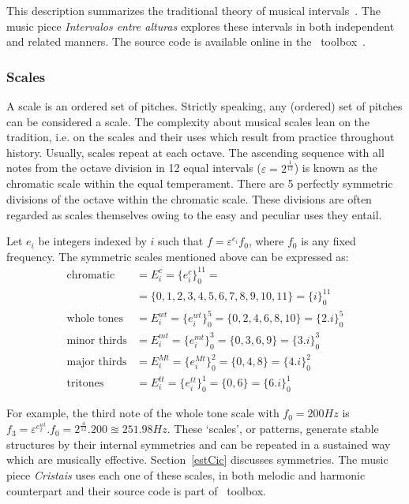 This description summarizes the traditional theory of musical intervals~\cite{Lacerda}. The music piece \emph{Intervalos entre alturas} explores these intervals in both independent and related manners. The source code is available online in the \massa\ toolbox~\cite{MASSA}.

\subsubsection{Scales}\label{subsec:escalas}
A scale is an ordered set of pitches. Strictly speaking, any (ordered) set of pitches can be considered a scale. The complexity about musical scales lean on the tradition, i.e. on the scales and their uses which result from practice throughout history. Usually, scales repeat at each octave. The ascending sequence with all notes from the octave division in 12 equal intervals ($\varepsilon=2^{\frac{1}{12}}$) is known as the chromatic scale within the equal temperament. There are 5 perfectly symmetric divisions of the octave within the chromatic scale. These divisions are often regarded as scales themselves owing to the easy and peculiar uses they entail.

Let $e_i$ be integers indexed by $i$ such that
$f=\varepsilon^{e_i} f_0$,
where $f_0$ is any fixed frequency.
The symmetric scales mentioned above can be expressed as:
\begin{equation}\label{escSim}
\begin{split}
\text{chromatic}    & = E_i^c = \{e_i^c\}_0^{11} = \\
                    & =  \{0,1,2,3,4,5,6,7,8,9,10,11\} = \{i\}_0^{11}\\
	\text{whole tones}  & = E_i^{wt} = \{e_i^{wt}\}_0^{5} = \{0,2,4,6,8,10\} = \{2.i\}_0^{5} \\
\text{minor thirds} & = E_i^{mt} = \{e_i^{mt}\}_0^{3} = \{0,3,6,9\} = \{3.i\}_0^3 \\
\text{major thirds} & = E_i^{Mt} = \{e_i^{Mt}\}_0^{2} = \{0,4,8\} = \{4.i\}_0^2\\
\text{tritones}     & = E_i^{tt} = \{e_i^{tt}\}_0^{1} = \{ 0, 6 \} = \{6.i\}_0^1
\end{split}
\end{equation}

For example, the third note of the whole tone scale with $f_0=200Hz$ is $f_3=\varepsilon^{e_2^{wt}}. f_0 = 2^{\frac{4}{12}} . 200 \approxeq 251.98
Hz$. These `scales', or patterns, generate stable structures by their internal symmetries and can be repeated in a sustained way which are musically effective. Section~\ref{estCic} discusses symmetries.
The music piece \emph{Cristais} uses each one of these scales, in both melodic and harmonic counterpart and their source code is part of \massa\ toolbox.

